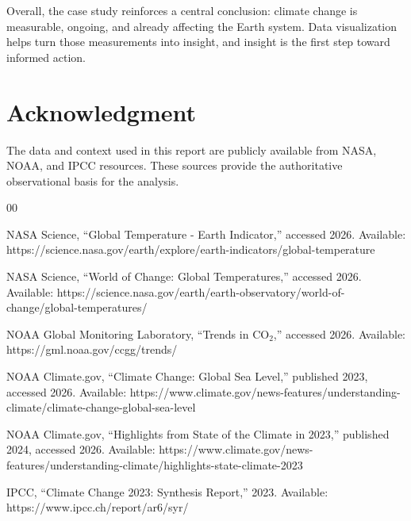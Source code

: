 \documentclass[conference]{IEEEtran}
\begin{document}
Overall, the case study reinforces a central conclusion: climate change is measurable, ongoing, and already affecting the Earth system. Data visualization helps turn those measurements into insight, and insight is the first step toward informed action.

\section*{Acknowledgment}
The data and context used in this report are publicly available from NASA, NOAA, and IPCC resources. These sources provide the authoritative observational basis for the analysis.

\begin{thebibliography}{00}

NASA Science, ``Global Temperature - Earth Indicator,'' accessed 2026. Available: https://science.nasa.gov/earth/explore/earth-indicators/global-temperature

NASA Science, ``World of Change: Global Temperatures,'' accessed 2026. Available: https://science.nasa.gov/earth/earth-observatory/world-of-change/global-temperatures/

NOAA Global Monitoring Laboratory, ``Trends in CO$_2$,'' accessed 2026. Available: https://gml.noaa.gov/ccgg/trends/

NOAA Climate.gov, ``Climate Change: Global Sea Level,'' published 2023, accessed 2026. Available: https://www.climate.gov/news-features/understanding-climate/climate-change-global-sea-level

NOAA Climate.gov, ``Highlights from State of the Climate in 2023,'' published 2024, accessed 2026. Available: https://www.climate.gov/news-features/understanding-climate/highlights-state-climate-2023

IPCC, ``Climate Change 2023: Synthesis Report,'' 2023. Available: https://www.ipcc.ch/report/ar6/syr/

\end{thebibliography}
\end{document}
